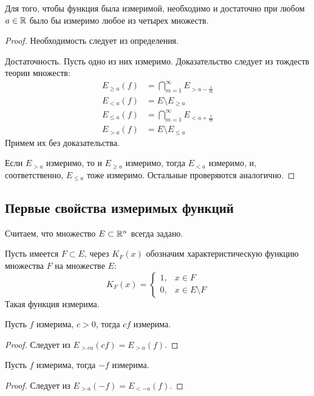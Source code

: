 \documentclass[main]{subfiles}
\begin{document}
\begin{theorem}
    Для того, чтобы функция была измеримой, необходимо и достаточно при любом $a \in \mathbb{R}$ было бы измеримо любое из четырех множеств.
\end{theorem}
\begin{proof}
    Необходимость следует из определения.

    Достаточность.
    Пусть одно из них измеримо.
    Доказательство следует из тождеств теории множеств:
    \[\begin{aligned}
            E_{\ge a}(f) & = \bigcap_{m=1}^\infty E_{> a - \frac{1}{m}} \\
            E_{< a}(f)   & = E \setminus E_{\ge a}                      \\
            E_{\le a}(f) & = \bigcap_{m=1}^\infty E_{< a + \frac{1}{m}} \\
            E_{> a}(f)   & = E \setminus E_{\le a}
        \end{aligned} \tag{1}\]
    Примем их без доказательства.

    Если $E_{>a}$ измеримо, то и $E_{\ge a}$ измеримо, тогда $E_{< a}$ измеримо, и, соответственно, $E_{\le a}$ тоже измеримо.
    Остальные проверяются аналогично.
\end{proof}

\subsection{Первые свойства измеримых функций}
Считаем, что множество $E \subset \mathbb{R}^n$ всегда задано.

\begin{property}
    Пусть имеется $F \subset E$, через $K_F(x)$ обозначим характеристическую функцию множества $F$ на множестве $E$:
    \[K_F(x) = \begin{cases}
            1, & x \in F             \\
            0, & x \in E \setminus F
        \end{cases}\]
    Такая функция измерима.
\end{property}

\begin{property}
    Пусть $f$ измерима, $c > 0$, тогда $cf$ измерима.
\end{property}
\begin{proof}
    Следует из $E_{> ca} (cf) = E_{>a} (f)$.
\end{proof}

\begin{property}
    Пусть $f$ измерима, тогда $-f$ измерима.
\end{property}
\begin{proof}
    Следует из $E_{>a}(-f) = E_{< -a} (f)$.
\end{proof}
\end{document}
